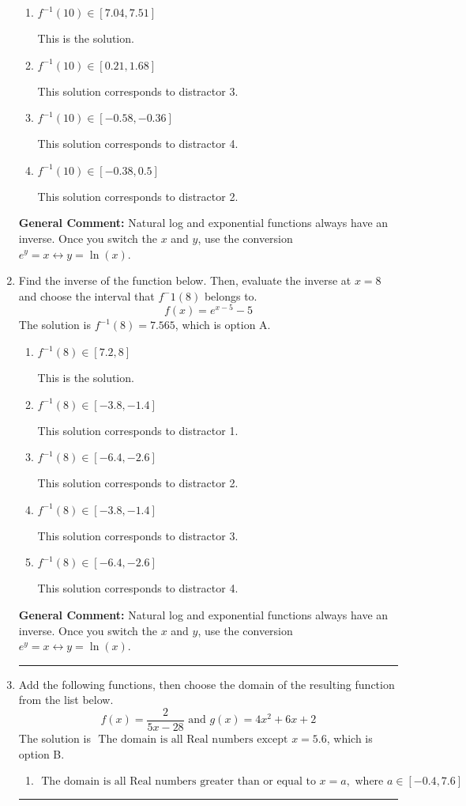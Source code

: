 \documentclass{extbook}[14pt]
\newcommand{\litem}[1]{\item #1

\rule{\textwidth}{0.4pt}}
\begin{document}
\begin{enumerate}
{\begin{enumerate}[label=\Alph*.]
 This solution corresponds to distractor 1.
\item \( f^{-1}(10) \in [7.04, 7.51] \)

 This is the solution.
\item \( f^{-1}(10) \in [0.21, 1.68] \)

 This solution corresponds to distractor 3.
\item \( f^{-1}(10) \in [-0.58, -0.36] \)

 This solution corresponds to distractor 4.
\item \( f^{-1}(10) \in [-0.38, 0.5] \)

 This solution corresponds to distractor 2.
\end{enumerate}

\textbf{General Comment:} Natural log and exponential functions always have an inverse. Once you switch the $x$ and $y$, use the conversion $ e^y = x \leftrightarrow y=\ln(x)$.
}
\litem{
Find the inverse of the function below. Then, evaluate the inverse at $x = 8$ and choose the interval that $f^-1(8)$ belongs to.
\[ f(x) = e^{x-5}-5 \]The solution is \( f^{-1}(8) = 7.565 \), which is option A.\begin{enumerate}[label=\Alph*.]
\item \( f^{-1}(8) \in [7.2, 8] \)

 This is the solution.
\item \( f^{-1}(8) \in [-3.8, -1.4] \)

 This solution corresponds to distractor 1.
\item \( f^{-1}(8) \in [-6.4, -2.6] \)

 This solution corresponds to distractor 2.
\item \( f^{-1}(8) \in [-3.8, -1.4] \)

 This solution corresponds to distractor 3.
\item \( f^{-1}(8) \in [-6.4, -2.6] \)

 This solution corresponds to distractor 4.
\end{enumerate}

\textbf{General Comment:} Natural log and exponential functions always have an inverse. Once you switch the $x$ and $y$, use the conversion $ e^y = x \leftrightarrow y=\ln(x)$.
}
\litem{
Add the following functions, then choose the domain of the resulting function from the list below.
\[ f(x) = \frac{2}{5x-28} \text{ and } g(x) = 4x^{2} +6 x + 2 \]The solution is \( \text{ The domain is all Real numbers except } x = 5.6 \), which is option B.\begin{enumerate}[label=\Alph*.]
\item \( \text{ The domain is all Real numbers greater than or equal to } x = a, \text{ where } a \in [-0.4, 7.6] \)



\end{enumerate}}
\end{enumerate}
\end{document}

